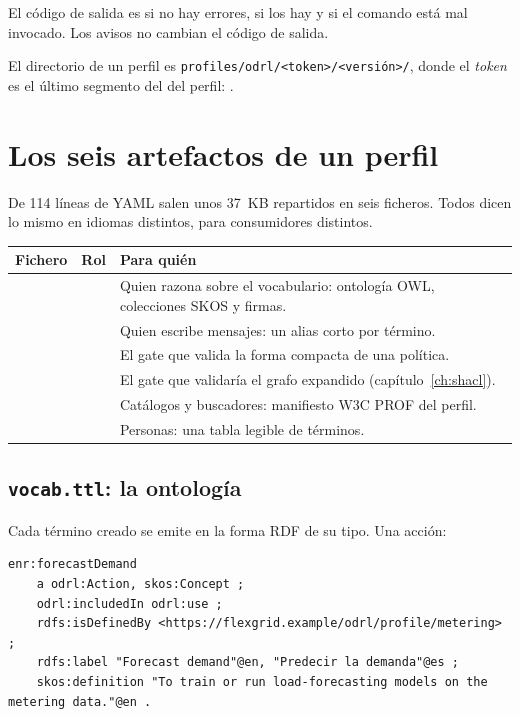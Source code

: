\medskip
El código de salida es  si no hay errores,  si los hay y  si el comando está mal invocado.
Los avisos no cambian el código de salida.

El directorio de un perfil es \texttt{profiles/\allowbreak{}odrl/\allowbreak{}<token>/\allowbreak{}<versión>/\allowbreak{}}, donde el \emph{token} es el último
segmento del  del perfil: .

\section{Los seis artefactos de un perfil}

De 114 líneas de YAML salen unos 37~KB repartidos en seis ficheros. Todos dicen lo mismo en idiomas distintos,
para consumidores distintos.

\noindent\begin{tabularx}{\linewidth}{@{}L{2.9cm}L{2.9cm}Y@{}}
\toprule
\textbf{Fichero} & \textbf{Rol} & \textbf{Para quién} \\
\midrule
{} &  & Quien razona sobre el vocabulario: ontología OWL, colecciones SKOS y firmas. \\
 &  & Quien escribe mensajes: un alias corto por término. \\
 &  & El gate que valida la forma compacta de una política. \\
 &  & El gate que validaría el grafo expandido (capítulo~\ref{ch:shacl}). \\
 &  & Catálogos y buscadores: manifiesto W3C PROF del perfil. \\
 &  & Personas: una tabla legible de términos. \\
\bottomrule
\end{tabularx}

\subsection{\texttt{vocab.ttl}: la ontología}

Cada término creado se emite en la forma RDF de su tipo. Una acción:

\begin{lstlisting}[style=ttl]
enr:forecastDemand
    a odrl:Action, skos:Concept ;
    odrl:includedIn odrl:use ;
    rdfs:isDefinedBy <https://flexgrid.example/odrl/profile/metering> ;
    rdfs:label "Forecast demand"@en, "Predecir la demanda"@es ;
    skos:definition "To train or run load-forecasting models on the metering data."@en .
\end{lstlisting}

